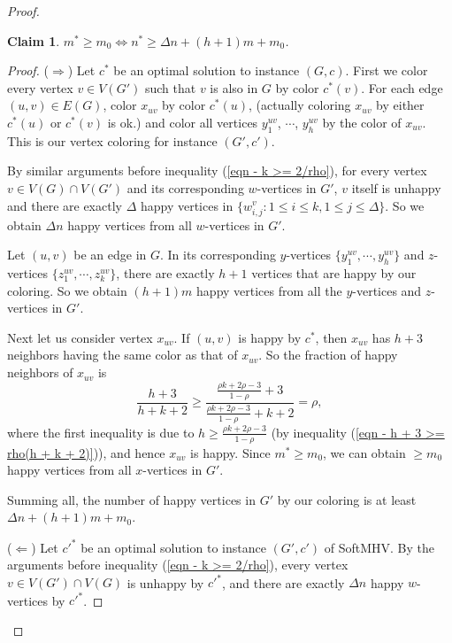 \documentclass[11pt]{article}
\newtheorem{claim}{Claim}
\begin{document}
\begin{proof}
\begin{claim}
$m^* \geq m_0 \Longleftrightarrow n^* \geq \Delta n + (h+1)m + m_0$.
\end{claim}
\begin{proof}
($\Longrightarrow$)
Let $c^*$ be an optimal solution to instance $(G, c)$.
First we color every vertex $v \in V(G')$ such that $v$ is also in $G$
by color $c^*(v)$. For each edge $(u, v) \in E(G)$, color $x_{uv}$
by color $c^*(u)$, (actually coloring $x_{uv}$ by either $c^*(u)$ or
$c^*(v)$ is ok.) and color all vertices $y_1^{uv}$, $\cdots$, $y_h^{uv}$
by the color of $x_{uv}$. This is our vertex coloring for instance $(G', c')$.

By similar arguments before inequality
(\ref{eqn - k >= 2/rho}), for every vertex $v \in V(G) \cap V(G')$ and its
corresponding $w$-vertices in $G'$, $v$ itself is unhappy and
there are exactly $\Delta$ happy vertices in
$\{w_{i,j}^v \colon 1 \leq i \leq k, 1 \leq j \leq \Delta\}$.
So we obtain $\Delta n$ happy vertices from all $w$-vertices in $G'$.

Let $(u, v)$ be an edge in $G$. In its corresponding
$y$-vertices $\{y_1^{uv}, \cdots, y_h^{uv}\}$ and
$z$-vertices $\{z_1^{uv}, \cdots, z_k^{uv}\}$,
there are exactly $h + 1$ vertices that are happy by our coloring.
So we obtain $(h + 1) m$ happy vertices from all the $y$-vertices
and $z$-vertices in $G'$.

Next let us consider vertex $x_{uv}$. If $(u, v)$ is happy by $c^*$,
then $x_{uv}$ has $h + 3$ neighbors having the same color as that of $x_{uv}$.
So the fraction of happy neighbors of $x_{uv}$ is
\begin{equation}
\frac{h+3}{h+k+2}
\geq
\frac{\frac{\rho k + 2\rho -3}{1 - \rho}+3}{\frac{\rho k + 2\rho -3}{1 - \rho} + k + 2}
= \rho, \nonumber
\end{equation}
where the first inequality is due to $h \geq \frac{\rho k + 2\rho -3}{1 - \rho}$
(by inequality (\ref{eqn - h + 3 >= rho(h + k + 2)})),
and hence $x_{uv}$ is happy.
Since $m^* \geq m_0$, we can obtain $\geq m_0$ happy vertices from
all $x$-vertices in $G'$.

Summing all, the number of happy vertices in $G'$ by our coloring
is at least $\Delta n + (h+1)m + m_0$.

($\Longleftarrow$)
Let $c'^*$ be an optimal solution to instance $(G', c')$ of SoftMHV.
By the arguments before inequality (\ref{eqn - k >= 2/rho}),
every vertex $v \in V(G') \cap V(G)$ is unhappy by $c'^*$,
and there are exactly $\Delta n$ happy $w$-vertices by $c'^*$.


\end{proof}
\end{proof}
\end{document}
